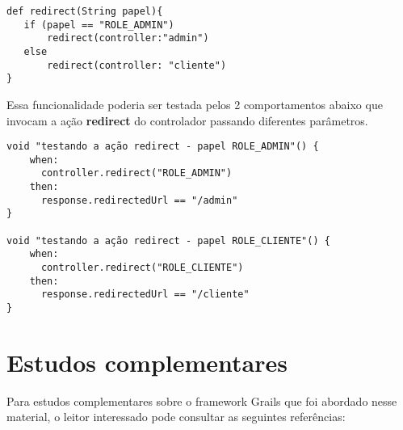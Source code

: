 \vspace{0.2cm}

\begin{mdframed}
\begin{footnotesize}
\begin{verbatim}
def redirect(String papel){
   if (papel == "ROLE_ADMIN")
       redirect(controller:"admin")
   else
       redirect(controller: "cliente")
}
\end{verbatim}
\end{footnotesize}
\end{mdframed}

\vspace{0.2cm}

Essa  funcionalidade  poderia ser  testada  pelos  2  comportamentos abaixo  que
invocam a ação {\bf redirect} do controlador passando diferentes parâmetros. 

\vspace{0.2cm}

\begin{mdframed}
\begin{footnotesize}
\begin{verbatim}
void "testando a ação redirect - papel ROLE_ADMIN"() {
    when:
      controller.redirect("ROLE_ADMIN")
    then:
      response.redirectedUrl == "/admin"
}

void "testando a ação redirect - papel ROLE_CLIENTE"() {
    when:
      controller.redirect("ROLE_CLIENTE")
    then:
      response.redirectedUrl == "/cliente"
}
\end{verbatim}
\end{footnotesize}
\end{mdframed}

\nocite{BR13}
\nocite{Grails}
\nocite{Groovy}
\nocite{VJN+13}
\nocite{JNS08}

\section{Estudos complementares}

\vspace{0.5cm}

Para  estudos complementares  sobre o  framework Grails  que foi  abordado nesse
material, o leitor interessado pode consultar as seguintes referências:

